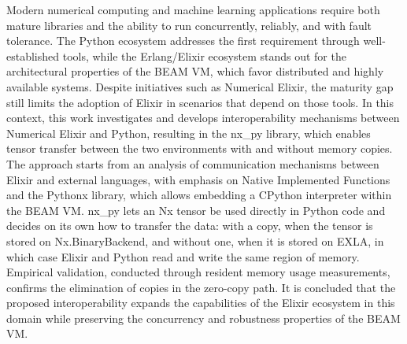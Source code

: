 
\begin{abstractutfpr}%
Modern numerical computing and machine learning applications require both mature libraries and the ability to run concurrently, reliably, and with fault tolerance. The Python ecosystem addresses the first requirement through well-established tools, while the Erlang/Elixir ecosystem stands out for the architectural properties of the BEAM VM, which favor distributed and highly available systems. Despite initiatives such as Numerical Elixir, the maturity gap still limits the adoption of Elixir in scenarios that depend on those tools. In this context, this work investigates and develops interoperability mechanisms between Numerical Elixir and Python, resulting in the nx\_py library, which enables tensor transfer between the two environments with and without memory copies. The approach starts from an analysis of communication mechanisms between Elixir and external languages, with emphasis on Native Implemented Functions and the Pythonx library, which allows embedding a CPython interpreter within the BEAM VM. nx\_py lets an Nx tensor be used directly in Python code and decides on its own how to transfer the data: with a copy, when the tensor is stored on Nx.BinaryBackend, and without one, when it is stored on EXLA, in which case Elixir and Python read and write the same region of memory. Empirical validation, conducted through resident memory usage measurements, confirms the elimination of copies in the zero-copy path. It is concluded that the proposed interoperability expands the capabilities of the Elixir ecosystem in this domain while preserving the concurrency and robustness properties of the BEAM VM.
\end{abstractutfpr}
